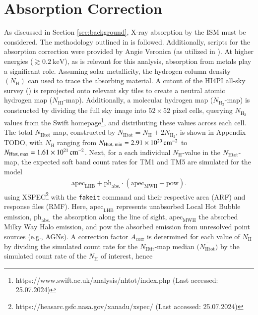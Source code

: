 \section{Absorption Correction}
As discussed in Section \ref{sec:background}, X-ray absorption by the ISM must be considered. The methodology outlined in \cite{Willingale2013} is followed. Additionally, scripts for the absorption correction were provided by Angie Veronica (as utilized in \cite{veronica2020}). At higher energies (\(\gtrsim \SI{0.2}{\kilo\electronvolt}\)), as is relevant for this analysis, absorption from metals play a significant role. 
Assuming solar metallicity, the hydrogen column density \({\textstyle (N_\text{H})}\) can used to trace the absorbing material. A cutout of the HI4PI all-sky survey (\cite{HI4PI2016}) is reprojected onto relevant sky tiles to create a neutral atomic hydrogen map (\({\textstyle N_{\text{HI}}}\)-map). Additionally, a molecular hydrogen map (\({\textstyle N_{\text{H}_2}}\)-map) is constructed by dividing the full sky image into \(52 \times 52\) pixel cells, querying \({\textstyle N_{\text{H}_2}}\) values from the Swift homepage\footnote{https://www.swift.ac.uk/analysis/nhtot/index.php (Last accessed: 25.07.2024)}, and distributing these values across each cell. The total \({\textstyle N_{\text{Htot}}}\)-map, constructed by \({\textstyle N_{\text{Htot}} = N_{\text{H}} + 2N_{\text{H}_2}}\), is shown in Appendix TODO, with \({\textstyle N_{\text{H}}}\) ranging from \({\textstyle N_\text{Htot, min} = \SI{2.91e+20}{{\centi\meter}^{-2}}}\) to \({\textstyle N_\text{Htot, max} = \SI{1.61e+21}{{\centi\meter}^{-2}}}\).
Next, for a each individual \({\textstyle N_{\text{H}}}\)-value in the \({\textstyle N_{\text{Htot}}}\)-map, the expected soft band count rates for TM1 and TM5 are simulated for the model
\begin{align*}
    \text{apec}_{\text{LHB}} + \text{ph}_\text{abs.}\cdot(\text{apec}_{\text{MWH}} + \text{pow}).
\end{align*}
using XSPEC\footnote{https://heasarc.gsfc.nasa.gov/xanadu/xspec/ (Last accessed: 25.07.2024)} with the \texttt{fakeit} command and their respective area (ARF) and response files (RMF). Here, \(\text{apec}_{\text{LHB}}\) represents unabsorbed Local Hot Bubble emission, \(\text{ph}_\text{abs.}\) the absorption along the line of sight, \(\text{apec}_{\text{MWH}}\) the absorbed Milky Way Halo emission, and \(\text{pow}\) the absorbed emission from unresolved point sources (e.g., AGNs). A correction factor \(A_{\text{corr}}\) is determined for each value of \(N_\text{H}\) by dividing the simulated count rate for the \({\textstyle N_{\text{Htit}}}\)-map median \({\textstyle \bigl(\overline{N_{\text{Htot}}}\bigr)}\) by the simulated count rate of the \({\textstyle N_{\text{H}}}\) of interest, hence
